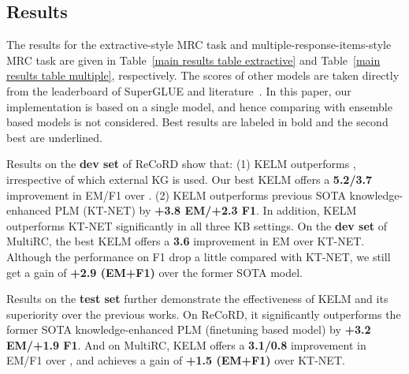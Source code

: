 \documentclass{article} \usepackage{iclr2022_conference,times}
\begin{document}
\subsection{Results}
The results for the extractive-style MRC task and multiple-response-items-style MRC task are given in Table~\ref{main results table extractive} and Table~\ref{main results table multiple}, respectively. The scores of other models are taken directly from the leaderboard of SuperGLUE and literature~\citep{qiu-etal-2019-machine, yang-etal-2019-enhancing-pre}. 
In this paper, our implementation is based on a single model, and hence comparing with ensemble based models is not considered. 
Best results are labeled in bold and the second best are underlined.

Results on the \textbf{dev set} of ReCoRD show that: (1) KELM outperforms , irrespective of which external KG is used. Our best KELM offers a \textbf{5.2/3.7} improvement in EM/F1 over . (2) KELM outperforms previous SOTA knowledge-enhanced PLM (KT-NET) by \textbf{+3.8 EM/+2.3 F1}. In addition, KELM outperforms KT-NET significantly in all three KB settings. On the \textbf{dev set} of MultiRC, the best KELM offers a \textbf{3.6} improvement in EM over KT-NET. Although the performance on F1 drop a little compared with KT-NET, we still get a gain of \textbf{+2.9 (EM+F1)} over the former SOTA model. 

Results on the \textbf{test set} further demonstrate the effectiveness of KELM and its superiority over the previous works. 
On ReCoRD, it significantly outperforms the former SOTA knowledge-enhanced PLM (finetuning based model) by \textbf{+3.2 EM/+1.9 F1}. And on MultiRC, KELM offers a \textbf{3.1/0.8} improvement in EM/F1 over , and achieves a gain of \textbf{+1.5 (EM+F1)} over KT-NET.
\end{document}

